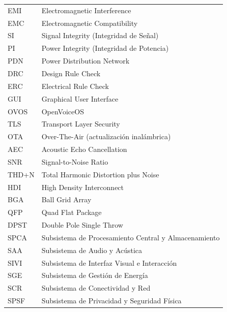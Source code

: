 \begin{longtable}{L{2.5cm} L{12cm}}
  EMI    & Electromagnetic Interference \\
  EMC    & Electromagnetic Compatibility \\
  SI     & Signal Integrity (Integridad de Señal) \\
  PI     & Power Integrity (Integridad de Potencia) \\
  PDN    & Power Distribution Network \\
  DRC    & Design Rule Check \\
  ERC    & Electrical Rule Check \\
  GUI    & Graphical User Interface \\
  OVOS   & OpenVoiceOS \\
  TLS    & Transport Layer Security \\
  OTA    & Over-The-Air (actualización inalámbrica) \\
  AEC    & Acoustic Echo Cancellation \\
  SNR    & Signal-to-Noise Ratio \\
  THD+N  & Total Harmonic Distortion plus Noise \\
  HDI    & High Density Interconnect \\
  BGA    & Ball Grid Array \\
  QFP    & Quad Flat Package \\
  DPST   & Double Pole Single Throw \\
  SPCA   & Subsistema de Procesamiento Central y Almacenamiento \\
  SAA    & Subsistema de Audio y Acústica \\
  SIVI   & Subsistema de Interfaz Visual e Interacción \\
  SGE    & Subsistema de Gestión de Energía \\
  SCR    & Subsistema de Conectividad y Red \\
  SPSF   & Subsistema de Privacidad y Seguridad Física \\
\end{longtable}
